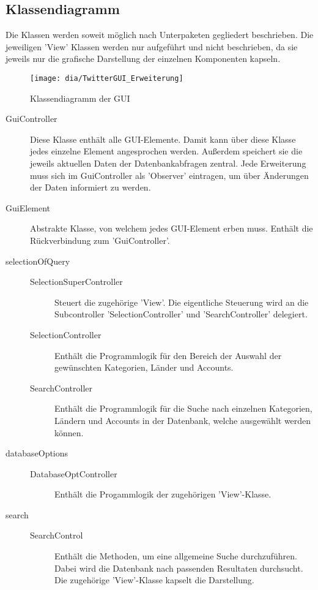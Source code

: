 \subsection{Klassendiagramm}
Die Klassen werden soweit möglich nach Unterpaketen gegliedert beschrieben. Die jeweiligen 'View' Klassen werden nur aufgeführt und nicht beschrieben, da sie jeweils nur die grafische Darstellung der einzelnen Komponenten kapseln.

\begin{figure}[h!]
	\centering
	\texttt{[image: dia/TwitterGUI\_Erweiterung]}
	\caption{Klassendiagramm der GUI}
	\label{fig:GUI}
\end{figure}
\quad
\begin{description}
	
	\item[GuiController] Diese Klasse enthält alle GUI-Elemente. Damit kann über diese Klasse jedes einzelne Element angesprochen werden. Außerdem speichert sie die jeweils aktuellen Daten der Datenbankabfragen zentral. Jede Erweiterung muss sich im GuiController als 'Observer' eintragen, um über Änderungen der Daten informiert zu werden. 
	\item[GuiElement] Abstrakte Klasse, von welchem jedes GUI-Element erben muss. Enthält die Rückverbindung zum 'GuiController'.
	\item[selectionOfQuery]  
	\quad
		 \begin{description}  	
		\item[SelectionSuperController] Steuert die zugehörige 'View'. Die eigentliche Steuerung wird an die Subcontroller 'SelectionController' und 'SearchController' delegiert.
		\item[SelectionController] Enthält die Programmlogik für den Bereich der Auswahl der gewünschten Kategorien, Länder und Accounts.
		\item[SearchController] Enthält die Programmlogik für die Suche nach einzelnen Kategorien, Ländern und Accounts in der Datenbank, welche ausgewählt werden können. 
		
		\end{description}
	\item[databaseOptions] 	\quad
		\begin{description}
			\item[DatabaseOptController] Enthält die Progammlogik der zugehörigen 'View'-Klasse.
		\end{description}
	\item[search] \quad
		\begin{description}
			\item[SearchControl] Enthält die Methoden, um eine allgemeine Suche durchzuführen. Dabei wird die Datenbank nach passenden Resultaten durchsucht. Die zugehörige 'View'-Klasse kapselt die Darstellung.
		\end{description}
		

\end{description}
